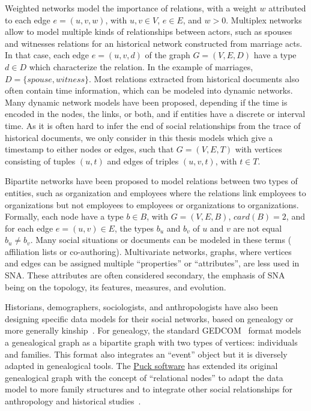 Weighted networks model the importance of relations, with a weight $w$ attributed to each edge $e = (u, v, w)$, with $u, v \in V$, $e \in E$, and $w > 0$.
Multiplex networks allow to model multiple kinds of relationships between actors, such as spouses and witnesses relations for an historical network constructed from marriage acts.
In that case, each edge $e = (u, v, d)$ of the graph $G = (V, E, D)$ have a type $d \in D$ which characterize the relation.
In the example of marriages, $D = \{spouse, witness\}$.
Most relations extracted from historical documents also often contain time information, which can be modeled into dynamic networks.
Many dynamic network models have been proposed\cite{rossettiCommunityDiscoveryDynamic2018}, depending if the time is encoded in the nodes, the links, or both, and if entities have a discrete or interval time.
As it is often hard to infer the end of social relationships from the trace of historical documents, we only consider in this thesis models which give a timestamp to either nodes or edges, such that $G = (V, E, T)$ with vertices consisting of tuples $(u, t)$ and edges of triples $(u, v, t)$, with $t \in T$.

Bipartite networks have been proposed to model relations between two types of entities, such as organization and employees where the relations link employees to organizations but not employees to employees or organizations to organizations\cite{borgattiSocialNetworkAnalysis2009}.
Formally, each node have a type $b \in B$, with $G = (V, E, B)$, $card(B) = 2$, and for each edge $e = (u, v) \in E$, the types $b_u$ and $b_v$ of $u$ and $v$ are not equal $b_u \neq b_v$.
Many social situations or documents can be modeled in these terms (%
affiliation lists or co-authoring).
Multivariate networks, \ie graphs, where vertices and edges can be assigned multiple ``properties'' or ``attributes'', are less used in SNA\@.
These attributes are often considered secondary, the emphasis of SNA being on the topology, its features, measures, and evolution.

Historians, demographers, sociologists, and anthropologists have also been designing specific data models for their social networks, based on genealogy or more generally kinship~\cite{hambergerKinshipNetworkAnalysis2011}.
For genealogy, the standard GEDCOM~\cite{gedcom} format models a genealogical graph as a bipartite graph with two types of vertices: individuals and families.
This format also integrates an ``event'' object but it is diversely adapted in genealogical tools.
The \href{https://www.kintip.net/}{Puck software} has extended its original genealogical graph with the concept of ``relational nodes'' to adapt the data model to more family structures and to integrate other social relationships for anthropology and historical studies~\cite{hambergerScanningPatternsRelationship2014}.

